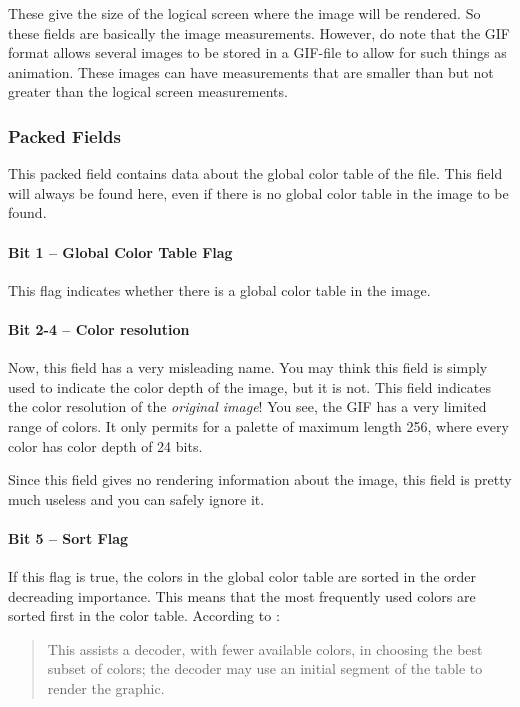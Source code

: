 \begin{refsection}
  These give the size of the logical screen where the image will be
  rendered. So these fields are basically the image
  measurements. However, do note that the GIF format allows several
  images to be stored in a GIF-file to allow for such things as
  animation. These images can have measurements that are smaller than
  but not greater than the logical screen measurements.

  \subsubsection{Packed Fields}

  This packed field contains data about the global color table of the
  file. This field will always be found here, even if there is no
  global color table in the image to be found.

  \paragraph{Bit 1 --  Global Color Table Flag}

  This flag indicates whether there is a global color table in the
  image.

  \paragraph{Bit 2-4 -- Color resolution}

  Now, this field has a very misleading name. You may think this field
  is simply used to indicate the color depth of the image, but it is
  not. This field indicates the color resolution of the
  \textit{original image}! You see, the GIF has a very limited range
  of colors. It only permits for a palette of maximum length 256,
  where every color has color depth of 24 bits.

  Since this field gives no rendering information about the image,
  this field is pretty much useless and you can safely ignore it.

  \paragraph{Bit 5 -- Sort Flag}

  If this flag is true, the colors in the global color table are
  sorted in the order decreading importance. This means that the most
  frequently used colors are sorted first in the color
  table. According to \cite{gif89a}:

  \begin{quote}
    This assists a decoder, with fewer available colors, in choosing
    the best subset of colors; the decoder may use an initial segment
    of the table to render the graphic.
  \end{quote}


\end{refsection}
